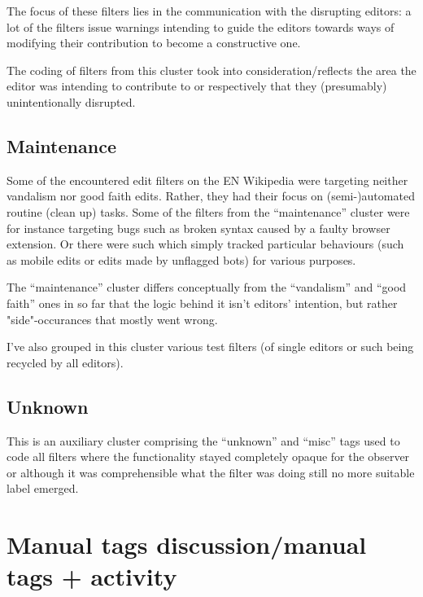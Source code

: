 The focus of these filters lies in the communication with the disrupting editors:
a lot of the filters issue warnings intending to guide the editors towards ways of modifying their contribution to become a constructive one.

The coding of filters from this cluster took into consideration/reflects the area the editor was intending to contribute to or respectively that they (presumably) unintentionally disrupted.


\subsection{Maintenance}

Some of the encountered edit filters on the EN Wikipedia were targeting neither vandalism nor good faith edits.
Rather, they had their focus on (semi-)automated routine (clean up) tasks.
Some of the filters from the ``maintenance'' cluster were for instance targeting bugs such as broken syntax caused by a faulty browser extension.
Or there were such which simply tracked particular behaviours (such as mobile edits or edits made by unflagged bots) for various purposes.

The ``maintenance'' cluster differs conceptually from the ``vandalism'' and ``good faith'' ones in so far that the logic behind it isn't editors' intention, but rather "side"-occurances that mostly went wrong.

I've also grouped in this cluster various test filters (of single editors or such being recycled by all editors).

\subsection{Unknown}

This is an auxiliary cluster comprising the ``unknown'' and ``misc'' tags %
used to code all filters where the functionality stayed completely opaque for the observer or although it was comprehensible what the filter was doing still no more suitable label emerged.

\section{Manual tags discussion/manual tags + activity}


